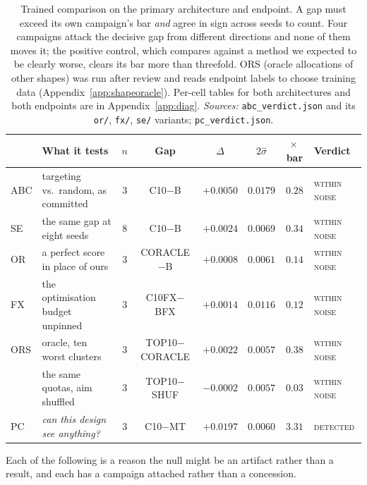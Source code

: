 \documentclass{article}
\newif\ifrevmarked \revmarkedtrue
\DeclareRobustCommand{\revB}[1]{\ifrevmarked{\color{RevB}#1}\else{#1}\fi}
\begin{document}
\begin{table}[t]
\caption{Trained comparison on the primary architecture and endpoint. A gap must
exceed its own campaign's bar \emph{and} agree in sign across seeds to count. Four campaigns attack
the decisive gap from different directions and none of them moves it; the positive control, which
compares against a method we expected to be clearly worse, clears its bar more than threefold.
\revB{ORS (oracle allocations of other shapes) was run after review and reads endpoint labels to choose training data (Appendix~\ref{app:shapeoracle}).}
Per-cell tables for both architectures and both endpoints are in Appendix~\ref{app:diag}.
\emph{Sources:} \texttt{abc\_verdict.json} and its \texttt{or/}, \texttt{fx/}, \texttt{se/}
variants; \texttt{pc\_verdict.json}.}
\label{tab:trained}
\begin{center}
\small
\setlength{\tabcolsep}{2.5pt}
\begin{tabular}{@{}llcccccl@{}}
\toprule
& What it tests & $n$ & Gap & $\Delta$ & $2\hat{\sigma}$ & $\times$\,bar & Verdict \\
\midrule
ABC & targeting vs.\ random, as committed & $3$ & C10$-$B & $+0.0050$ & $0.0179$ & $0.28$ & \textsc{within noise} \\
SE & the same gap at eight seeds & $8$ & C10$-$B & $+0.0024$ & $0.0069$ & $0.34$ & \textsc{within noise} \\
OR & a perfect score in place of ours & $3$ & CORACLE$-$B & $+0.0008$ & $0.0061$ & $0.14$ & \textsc{within noise} \\
FX & the optimisation budget unpinned & $3$ & C10FX$-$BFX & $+0.0014$ & $0.0116$ & $0.12$ & \textsc{within noise} \\
\revB{ORS} & \revB{oracle, ten worst clusters} & \revB{$3$} & \revB{TOP10$-$CORACLE} & \revB{$+0.0022$} & \revB{$0.0057$} & \revB{$0.38$} & \revB{\textsc{within noise}} \\
 & \revB{the same quotas, aim shuffled} & \revB{$3$} & \revB{TOP10$-$SHUF} & \revB{$-0.0002$} & \revB{$0.0057$} & \revB{$0.03$} & \revB{\textsc{within noise}} \\
\midrule
PC & \emph{can this design see anything?} & $3$ & C10$-$MT & $+0.0197$ & $0.0060$ & $\mathbf{3.31}$ & \textsc{detected} \\
\bottomrule
\end{tabular}
\end{center}
\end{table}

Each of the following is a reason the null might be an artifact rather than a result, and each has a campaign attached rather than a concession.
\end{document}
